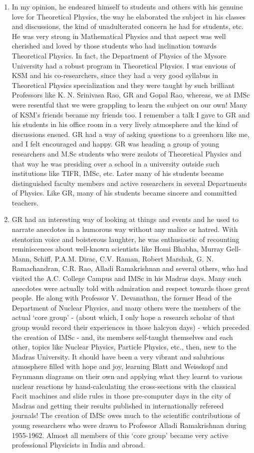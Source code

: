 \begin{enumerate}
\item In my opinion, he endeared himself to students and others with his genuine love for Theoretical Physics, the way he elaborated the subject in his classes and discussions, the kind of unadulterated concern he had for students, etc. He was very strong in Mathematical Physics and that aspect was well cherished and loved by those students who had inclination towards Theoretical Physics. In fact, the Department of Physics of the Mysore University had a robust program in Theoretical Physics. I was envious of KSM and his co-researchers, since they had a very good syllabus in Theoretical Physics specialization and they were taught by such brilliant Professors like K. N. Srinivasa Rao, GR and Gopal Rao, whereas, we at IMSc were resentful that we were grappling to learn the subject on our own! Many of KSM's friends became my friends too. I remember a talk I gave to GR and his students in his office room in a very lively atmosphere and the kind of discussions ensued. GR had a way of asking questions to a greenhorn like me, and I felt encouraged and happy. GR was heading a group of young researchers and M.Sc students who were zealots of Theoretical Physics and that way he was presiding over a school in a university outside such institutions like TIFR, IMSc, etc. Later many of his students became distinguished faculty members and active researchers in several Departments of Physics. Like GR, many of his students became sincere and committed teachers.
\item GR had an interesting way of looking at things and events and he used to narrate anecdotes in a humorous way without any malice or hatred. With stentorian voice and boisterous laughter, he was enthusiastic of recounting reminiscences about well-known scientists like Homi Bhabha, Murray Gell-Mann, Schiff, P.A.M. Dirac, C.V. Raman, Robert Marshak, G. N. Ramachandran, C.R. Rao, Alladi Ramakrishnan and several others, who had visited the A.C. College Campus and IMSc in his Madras days. Many such anecdotes were actually told with admiration and respect towards those great people. He along with Professor V. Devanathan, the former Head of the Department of Nuclear Physics, and many others were the members of the actual `core group' - (about which, I only hope a research scholar of that group would record their experiences in those halcyon days) - which preceded the creation of IMSc - and, its members self-taught themselves and each other, topics like Nuclear Physics, Particle Physics, etc., then, new to the Madras University. It should have been a very vibrant and salubrious atmosphere filled with hope and joy, learning Blatt and Weisskopf and Feynmann diagrams on their own and applying what they learnt to various nuclear reactions by hand-calculating the cross-sections with the classical Facit machines and slide rules in those pre-computer days in the city of Madras and getting their results published in internationally refereed journals! The creation of IMSc owes much to the scientific contributions of young researchers who were drawn to Professor Alladi Ramakrishnan during 1955-1962. Almost all members of this `core group' became very active professional Physicists in India and abroad.

\end{enumerate}
